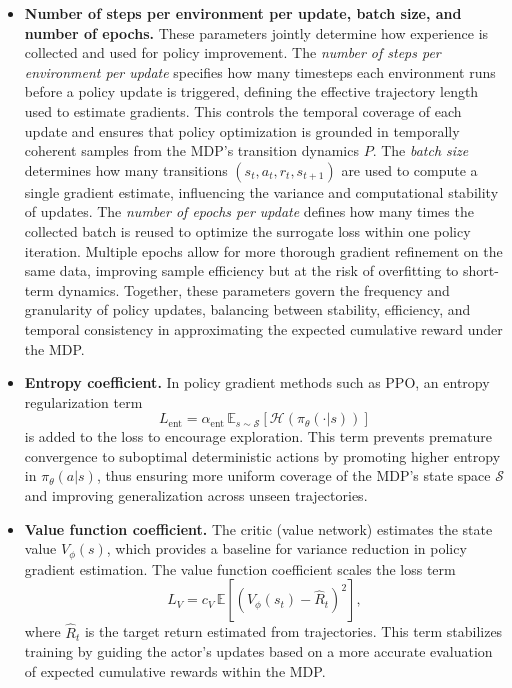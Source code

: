 \documentclass[english, 12pt, a4paper, elec, utf8, a-2b, online]{aaltothesis}
\begin{document}
\begin{itemize}
    \item \textbf{Number of steps per environment per update, batch size, and number of epochs.}  
    These parameters jointly determine how experience is collected and used for policy improvement.  
    The \textit{number of steps per environment per update} specifies how many timesteps each environment runs before a policy update is triggered, defining the effective trajectory length used to estimate gradients. This controls the temporal coverage of each update and ensures that policy optimization is grounded in temporally coherent samples from the MDP’s transition dynamics $P$.  
    The \textit{batch size} determines how many transitions $(s_t, a_t, r_t, s_{t+1})$ are used to compute a single gradient estimate, influencing the variance and computational stability of updates.  
    The \textit{number of epochs per update} defines how many times the collected batch is reused to optimize the surrogate loss within one policy iteration. Multiple epochs allow for more thorough gradient refinement on the same data, improving sample efficiency but at the risk of overfitting to short-term dynamics.  
    Together, these parameters govern the frequency and granularity of policy updates, balancing between stability, efficiency, and temporal consistency in approximating the expected cumulative reward under the MDP.
    
    \item \textbf{Entropy coefficient.}  
    In policy gradient methods such as PPO, an entropy regularization term
    \begin{equation}
    L_{\text{ent}} = \alpha_{\text{ent}} \, \mathbb{E}_{s \sim \mathcal{S}}\!\left[\mathcal{H}(\pi_\theta(\cdot|s))\right]
    \end{equation}
    is added to the loss to encourage exploration. This term prevents premature convergence to suboptimal deterministic actions by promoting higher entropy in $\pi_\theta(a|s)$, thus ensuring more uniform coverage of the MDP’s state space $\mathcal{S}$ and improving generalization across unseen trajectories.
    
    \item \textbf{Value function coefficient.}  
    The critic (value network) estimates the state value $V_\phi(s)$, which provides a baseline for variance reduction in policy gradient estimation. The value function coefficient scales the loss term
    \begin{equation}
    L_V = c_V \, \mathbb{E}\!\left[(V_\phi(s_t) - \hat{R}_t)^2\right],
    \end{equation}
    where $\hat{R}_t$ is the target return estimated from trajectories. This term stabilizes training by guiding the actor’s updates based on a more accurate evaluation of expected cumulative rewards within the MDP.
    

\end{itemize}
\end{document}
